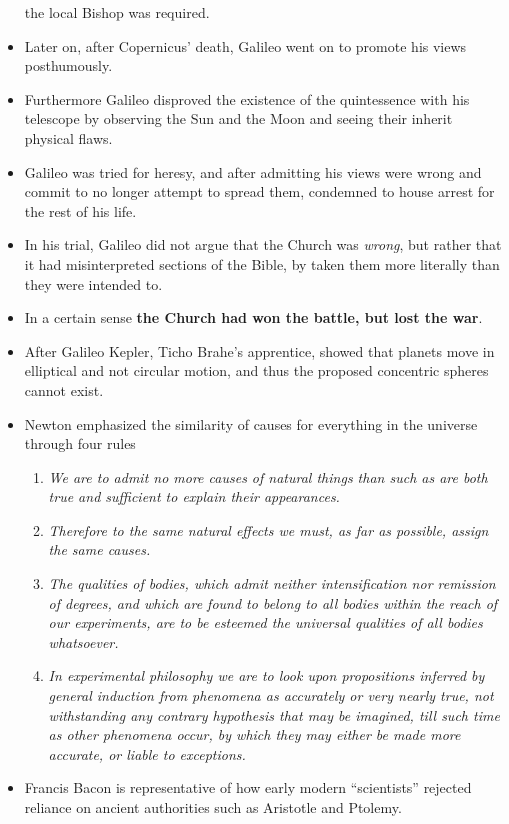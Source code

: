 \documentclass{article}
\begin{document}
\begin{spacing}{1.2}
\begin{itemize}
            the local Bishop was required.
        \item Later on, after Copernicus' death, Galileo went on to promote his
            views posthumously.
        \item Furthermore Galileo disproved the existence of the quintessence
            with his telescope by observing the Sun and the Moon and seeing
            their inherit physical flaws.
        \item Galileo was tried for heresy, and after admitting his views were
            wrong and commit to no longer attempt to spread them, condemned to
            house arrest for the rest of his life.
        \item In his trial, Galileo did not argue that the Church was
            \textit{wrong}, but rather that it had misinterpreted sections of
            the Bible, by taken them more literally than they were intended to.
        \item In a certain sense \textbf{the Church had won the battle, but lost
            the war}.
        \item After Galileo Kepler, Ticho Brahe's apprentice, showed that
            planets move in elliptical and not circular motion, and thus the
            proposed concentric spheres cannot exist.
        \item Newton emphasized the similarity of causes for everything in the
            universe through four rules
            \begin{enumerate}
                \item \textit{We are to admit no more causes of natural things than such
                        as are both true and sufficient to explain their
                    appearances.}
                \item \textit{Therefore to the same natural effects we must, as far as
                    possible, assign the same causes.}
                \item \textit{The qualities of bodies, which admit neither
                        intensification nor remission of degrees, and which are
                        found to belong to all bodies within the reach of our
                        experiments, are to be esteemed the universal qualities of
                    all bodies whatsoever.}
                \item \textit{In experimental philosophy we are to look upon
                        propositions inferred by general induction from phenomena
                        as accurately or very nearly true, not withstanding any
                        contrary hypothesis that may be imagined, till such time as
                        other phenomena occur, by which they may either be made
                    more accurate, or liable to exceptions.}
            \end{enumerate}
        \item Francis Bacon is representative of how early modern ``scientists''
            rejected reliance on ancient authorities such as Aristotle and
            Ptolemy.
    \end{itemize}

\end{spacing}
\end{document}
